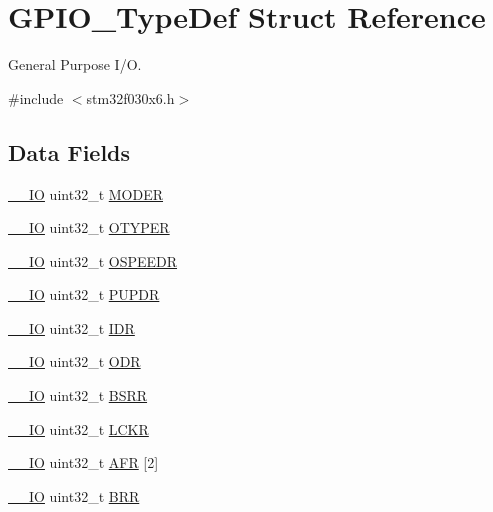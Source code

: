 \hypertarget{struct_g_p_i_o___type_def}{}\section{G\+P\+I\+O\+\_\+\+Type\+Def Struct Reference}
\label{struct_g_p_i_o___type_def}


General Purpose I/O.  




{\ttfamily \#include $<$stm32f030x6.\+h$>$}

\subsection*{Data Fields}
\begin{DoxyCompactItemize}
\item 
\hyperlink{core__sc300_8h_aec43007d9998a0a0e01faede4133d6be}{\+\_\+\+\_\+\+IO} uint32\+\_\+t \hyperlink{struct_g_p_i_o___type_def_a2b671a94c63a612f81e0e9de8152d01c}{M\+O\+D\+ER}
\item 
\hyperlink{core__sc300_8h_aec43007d9998a0a0e01faede4133d6be}{\+\_\+\+\_\+\+IO} uint32\+\_\+t \hyperlink{struct_g_p_i_o___type_def_a9543592bda60cb5261075594bdeedac9}{O\+T\+Y\+P\+ER}
\item 
\hyperlink{core__sc300_8h_aec43007d9998a0a0e01faede4133d6be}{\+\_\+\+\_\+\+IO} uint32\+\_\+t \hyperlink{struct_g_p_i_o___type_def_a328d16cc6213783ede54e4059ffd50a3}{O\+S\+P\+E\+E\+DR}
\item 
\hyperlink{core__sc300_8h_aec43007d9998a0a0e01faede4133d6be}{\+\_\+\+\_\+\+IO} uint32\+\_\+t \hyperlink{struct_g_p_i_o___type_def_abeed38529bd7b8de082e490e5d4f1727}{P\+U\+P\+DR}
\item 
\hyperlink{core__sc300_8h_aec43007d9998a0a0e01faede4133d6be}{\+\_\+\+\_\+\+IO} uint32\+\_\+t \hyperlink{struct_g_p_i_o___type_def_a328d2fe9ef1d513c3a97d30f98f0047c}{I\+DR}
\item 
\hyperlink{core__sc300_8h_aec43007d9998a0a0e01faede4133d6be}{\+\_\+\+\_\+\+IO} uint32\+\_\+t \hyperlink{struct_g_p_i_o___type_def_abff7fffd2b5a718715a130006590c75c}{O\+DR}
\item 
\hyperlink{core__sc300_8h_aec43007d9998a0a0e01faede4133d6be}{\+\_\+\+\_\+\+IO} uint32\+\_\+t \hyperlink{struct_g_p_i_o___type_def_ac25dd6b9e3d55e17589195b461c5ec80}{B\+S\+RR}
\item 
\hyperlink{core__sc300_8h_aec43007d9998a0a0e01faede4133d6be}{\+\_\+\+\_\+\+IO} uint32\+\_\+t \hyperlink{struct_g_p_i_o___type_def_a2612a0f4b3fbdbb6293f6dc70105e190}{L\+C\+KR}
\item 
\hyperlink{core__sc300_8h_aec43007d9998a0a0e01faede4133d6be}{\+\_\+\+\_\+\+IO} uint32\+\_\+t \hyperlink{struct_g_p_i_o___type_def_a7100354be30ab2f2248e2c3e94ace993}{A\+FR} \mbox{[}2\mbox{]}
\item 
\hyperlink{core__sc300_8h_aec43007d9998a0a0e01faede4133d6be}{\+\_\+\+\_\+\+IO} uint32\+\_\+t \hyperlink{struct_g_p_i_o___type_def_a092e59d908b2ca112e31047e942340cb}{B\+RR}
\end{DoxyCompactItemize}


